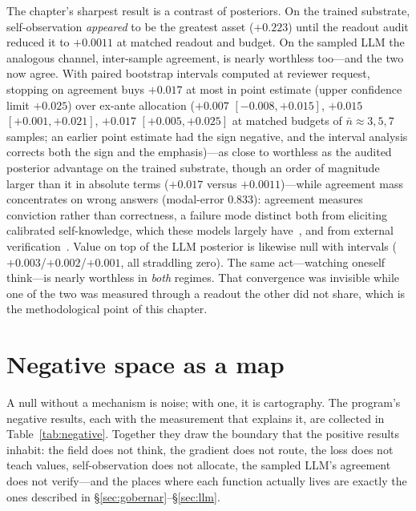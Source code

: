 \documentclass{article}
\newcommand{\LLMmodalerr}{$0.833$}
\newcommand{\Rasign}{$+0.0011$} \newcommand{\RasignIC}{$[+0.0003,\,+0.0019]$}
\begin{document}
The chapter's sharpest result is a contrast of posteriors. On the trained
substrate, self-observation \emph{appeared} to be the greatest asset
($+0.223$) until the readout audit reduced it to \Rasign{} at matched
readout and budget. On the sampled LLM the analogous channel, inter-sample
agreement, is nearly worthless too---and the two now agree. With paired bootstrap intervals computed
at reviewer request, stopping on agreement buys $+0.017$ at most in point
estimate (upper confidence limit $+0.025$) over
ex-ante allocation ($+0.007$ $[-0.008,+0.015]$, $+0.015$
$[+0.001,+0.021]$, $+0.017$ $[+0.005,+0.025]$ at matched budgets of
$\bar n \approx 3, 5, 7$ samples; an earlier point estimate had the sign
negative, and the interval analysis corrects both the sign and the
emphasis)---as close to worthless as the audited posterior advantage on the
trained substrate, though an order of magnitude larger than it in absolute
terms ($+0.017$ versus \Rasign{})---while agreement
mass concentrates on wrong
answers (modal-error \LLMmodalerr): agreement measures conviction rather
than correctness, a failure mode distinct both from eliciting calibrated
self-knowledge, which these models largely
have~\citep{kadavath2022know,lin2022teaching}, and from external
verification~\citep{cobbe2021training,lightman2024let}. Value on top of
the LLM posterior is likewise null with intervals
($+0.003$/$+0.002$/$+0.001$, all straddling zero). The same
act---watching oneself think---is nearly worthless in \emph{both} regimes.
That convergence was invisible while one of the two was measured through a
readout the other did not share, which is the methodological point of this
chapter.

\section{Negative space as a map}\label{sec:negative}

A null without a mechanism is noise; with one, it is cartography. The
program's negative results, each with the measurement that explains it, are
collected in Table~\ref{tab:negative}. Together they draw the boundary that
the positive results inhabit: the field does not think, the gradient does
not route, the loss does not teach values, self-observation does not
allocate, the sampled LLM's agreement does
not verify---and the places where each function actually lives are exactly
the ones described in \S\ref{sec:gobernar}--\S\ref{sec:llm}.
\end{document}
